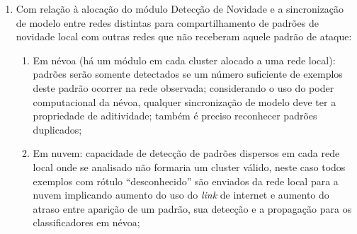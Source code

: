 \begin{enumerate}
  
  \item Com relação à alocação do módulo Detecção de Novidade e a sincronização de
  modelo entre redes distintas para compartilhamento de padrões de novidade local
  com outras redes que não receberam aquele padrão de ataque:
  \begin{enumerate}
    
    \item Em névoa (há um módulo em cada cluster alocado a uma rede local): padrões serão
    somente detectados se um número suficiente de exemplos deste padrão ocorrer
    na rede observada; considerando o uso do poder computacional da névoa, qualquer
    sincronização de modelo deve ter a propriedade de aditividade; também é preciso  reconhecer padrões duplicados;

    \item Em nuvem: capacidade de detecção de padrões dispersos em cada rede
    local onde se analisado não formaria um cluster válido,
    neste caso todos exemplos com rótulo ``desconhecido''  são enviados da rede
    local para a nuvem implicando aumento do uso do \emph{link} de internet e
    aumento do atraso entre aparição de um padrão, sua detecção e a propagação
    para os classificadores em névoa;


\end{enumerate}
\end{enumerate}
